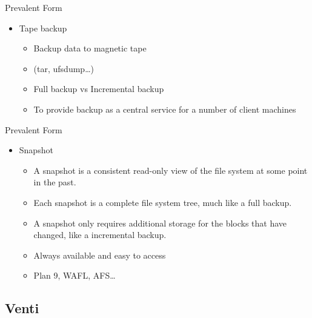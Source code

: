 \begin{frame}{Prevalent Form}

\begin{itemize}
\itemsep1pt\parskip0pt
\item
  Tape backup

  \begin{itemize}
  \itemsep1pt\parskip0pt
  \item
    Backup data to magnetic tape
  \item
    (tar, ufsdump\ldots{})
  \item
    Full backup vs Incremental backup
  \item
    To provide backup as a central service for a number of client
    machines
  \end{itemize}
\end{itemize}

\end{frame}

\begin{frame}{Prevalent Form}

\begin{itemize}
\itemsep1pt\parskip0pt
\item
  Snapshot

  \begin{itemize}
  \itemsep1pt\parskip0pt
  \item
    A snapshot is a consistent read-only view of the file system at some
    point in the past.
  \item
    Each snapshot is a complete file system tree, much like a full
    backup.
  \item
    A snapshot only requires additional storage for the blocks that have
    changed, like a incremental backup.
  \item
    Always available and easy to access
  \item
    Plan 9, WAFL, AFS\ldots{}
  \end{itemize}
\end{itemize}

\end{frame}

\subsection{Venti}\label{venti}

